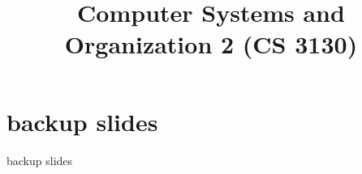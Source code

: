 \date{}
\title{Computer Systems and Organization 2 (CS 3130)}
\date{}

\begin{frame}
    \titlepage
\end{frame}







\section{backup slides}
\begin{frame}{backup slides}
\end{frame}


